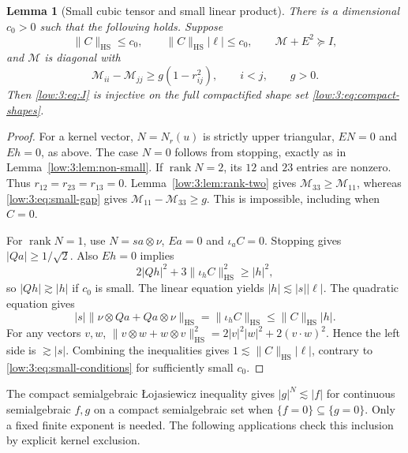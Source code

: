 \documentclass[11pt]{amsart}
\newtheorem{lemma}[theorem]{Lemma}
\theoremstyle{definition}
\theoremstyle{remark}
\newcommand{\norm}[1]{\lVert #1\rVert}
\newcommand{\abs}[1]{\lvert #1\rvert}
\DeclareMathOperator{\rank}{rank}
\numberwithin{equation}{section}
\begin{document}
\begin{lemma}[Small cubic tensor and small linear product]\label{low:3:lem:small-product}
There is a dimensional $c_0>0$ such that the following holds. Suppose
\begin{equation}\label{low:3:eq:small-conditions}
\norm C_{\mathrm{HS}}\leq c_0,\qquad \norm C_{\mathrm{HS}}\abs\ell\leq c_0,\qquad \mathscr M+E^2\succeq I,
\end{equation}
and $\mathscr M$ is diagonal with
\begin{equation}\label{low:3:eq:small-gap}
\mathscr M_{ii}-\mathscr M_{jj}\geq g(1-r_{ij}^2),\qquad i<j,\qquad g>0.
\end{equation}
Then \eqref{low:3:eq:J} is injective on the full compactified shape set \eqref{low:3:eq:compact-shapes}.
\end{lemma}

\begin{proof}
For a kernel vector, $N=N_r(u)$ is strictly upper triangular, $EN=0$ and $Eh=0$, as above. The case $N=0$ follows from stopping, exactly as in Lemma~\ref{low:3:lem:non-small}. If $\rank N=2$, its $12$ and $23$ entries are nonzero. Thus $r_{12}=r_{23}=r_{13}=0$. Lemma~\ref{low:3:lem:rank-two} gives $\mathscr M_{33}\geq\mathscr M_{11}$, whereas \eqref{low:3:eq:small-gap} gives $\mathscr M_{11}-\mathscr M_{33}\geq g$. This is impossible, including when $C=0$.

For $\rank N=1$, use $N=s a\otimes\nu$, $Ea=0$ and $\iota_aC=0$. Stopping gives $\abs{Qa}\geq1/\sqrt2$. Also $Eh=0$ implies
\[
2\abs{Qh}^2+3\norm{\iota_hC}_{\mathrm{HS}}^2\geq\abs h^2,
\]
so $\abs{Qh}\gtrsim\abs h$ if $c_0$ is small. The linear equation yields $\abs h\lesssim \abs s\abs\ell$. The quadratic equation gives
\[
\abs s\norm{\nu\otimes Qa+Qa\otimes\nu}_{\mathrm{HS}}=\norm{\iota_hC}_{\mathrm{HS}}\leq\norm C_{\mathrm{HS}}\abs h.
\]
For any vectors $v,w$, $\norm{v\otimes w+w\otimes v}_{\mathrm{HS}}^2=2\abs v^2\abs w^2+2(v\cdot w)^2$. Hence the left side is $\gtrsim\abs s$. Combining the inequalities gives $1\lesssim \norm C_{\mathrm{HS}}\abs\ell$, contrary to \eqref{low:3:eq:small-conditions} for sufficiently small $c_0$.
\end{proof}


The compact semialgebraic {\L}ojasiewicz inequality \cite[Theorem 2.2]{low:lojasiewicz} gives $|g|^N\lesssim |f|$ for continuous semialgebraic $f,g$ on a compact semialgebraic set when $\{f=0\}\subseteq\{g=0\}$. Only a fixed finite exponent is needed. The following applications check this inclusion by explicit kernel exclusion.
\end{document}
